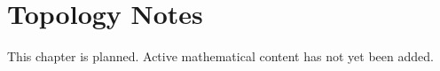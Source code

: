 
\section*{Topology Notes}
This chapter is planned. Active mathematical content has not yet been added.
